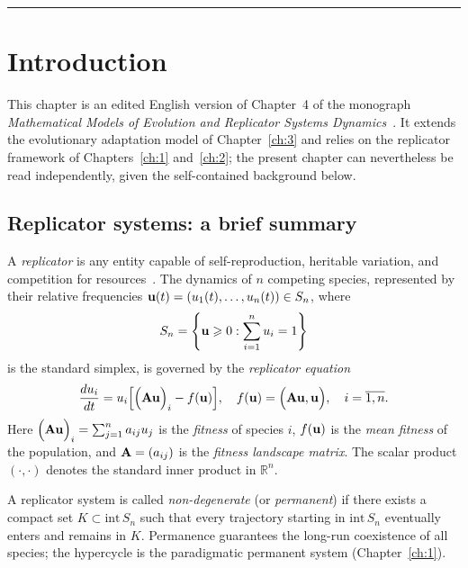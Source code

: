 \documentclass[12pt]{report}
\newcommand{\inside}{\mathrm{int}\,}
\theoremstyle{definition}
\theoremstyle{remark}
\begin{document}
\bigskip\hrule\bigskip

\section*{Introduction}
This chapter is an edited English version of Chapter~4 of the monograph
\textit{Mathematical Models of Evolution and Replicator Systems
Dynamics}~\cite{c4:BratusBook2022}. It extends the evolutionary adaptation
model of Chapter~\ref{ch:3} and relies on the replicator framework of
Chapters~\ref{ch:1} and~\ref{ch:2}; the present chapter can nevertheless be
read independently, given the self-contained background below.

\subsection*{Replicator systems: a brief summary}

A \textit{replicator} is any entity capable of self-reproduction, heritable
variation, and competition for resources~\cite{c4:Eigen1971,c4:Eigen1979}. The
dynamics of $n$ competing species, represented by their relative frequencies
${\bf u}(t) = (u_1(t), \ldots, u_n(t)) \in S_n$, where
\[
    S_n = \left\{ {\bf u} \geqslant 0 : \sum_{i=1}^n u_i = 1 \right\}
\]
is the standard simplex, is governed by the \textit{replicator equation}
\begin{equation}
    \frac{du_i}{dt} = u_i\Big[\Big({\bf Au}\Big)_i - f({\bf u})\Big],
    \quad f({\bf u}) = \Big({\bf Au}, {\bf u}\Big), \quad i = \overline{1,n}.
    \label{c4:eq1.5}
\end{equation}
Here $\Big({\bf Au}\Big)_i = \sum_{j=1}^n a_{ij} u_j$ is the \textit{fitness}
of species $i$, $f({\bf u})$ is the \textit{mean fitness} of the population,
and ${\bf A} = (a_{ij})$ is the \textit{fitness landscape matrix}. The scalar
product $(\cdot,\cdot)$ denotes the standard inner product in $\mathbb{R}^n$.

A replicator system is called \textit{non-degenerate} (or \textit{permanent}) if
there exists a compact set $K \subset \inside S_n$ such that every trajectory
starting in $\inside S_n$ eventually enters and remains in $K$. Permanence
guarantees the long-run coexistence of all species; the hypercycle is the
paradigmatic permanent system (Chapter~\ref{ch:1}).
\end{document}
